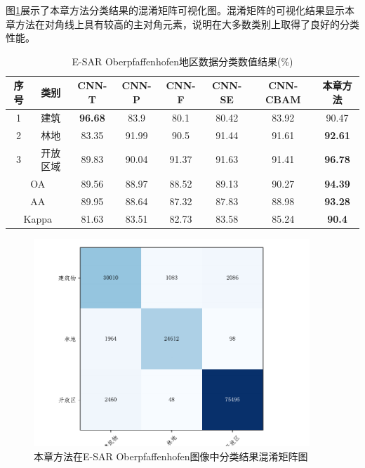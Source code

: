图\ref{fig:ober_conf_matrix}展示了本章方法分类结果的混淆矩阵可视化图。混淆矩阵的可视化结果显示本章方法在对角线上具有较高的主对角元素，说明在大多数类别上取得了良好的分类性能。

\begin{table}[ht!]
    \caption{E-SAR Oberpfaffenhofen地区数据分类数值结果(\%)}
    \label{tab:ober_res}
    \begin{tabular}{cccccccc}
        \toprule[1.5bp]
        序号                        & 类别    & CNN-T          & CNN-P & CNN-F & CNN-SE & CNN-CBAM       & 本章方法           \\
        \midrule[0.75bp]
        1                         & 建筑    & \textbf{96.68} & 83.9  & 80.1  & 80.42  & 83.92          & 90.47          \\
        2                         & 林地    & 83.35          & 91.99 & 90.5  & 91.44  & 91.61          & \textbf{92.61} \\
        3                         & 开放区域  & 89.83          & 90.04 & 91.37 & 91.63  & 91.41          & \textbf{96.78} \\
        \midrule[0.75bp]
        \multicolumn{2}{c}{OA}    & 89.56 & 88.97          & 88.52 & 89.13 & 90.27  & \textbf{94.39}                  \\
        \multicolumn{2}{c}{AA}    & 89.95 & 88.64          & 87.32 & 87.83 & 88.98  & \textbf{93.28}                  \\
        \multicolumn{2}{c}{Kappa} & 81.63 & 83.51          & 82.73 & 83.58 & 85.24  & \textbf{90.4}                   \\
        \bottomrule[1.5bp]
    \end{tabular}
\end{table}

\begin{figure}[ht!]
    \centering
    \includegraphics[width=10.4cm]{pic/chapter3/ober/conf-matrix.pdf}
    \caption{本章方法在E-SAR Oberpfaffenhofen图像中分类结果混淆矩阵图}
    \label{fig:ober_conf_matrix}
\end{figure}



